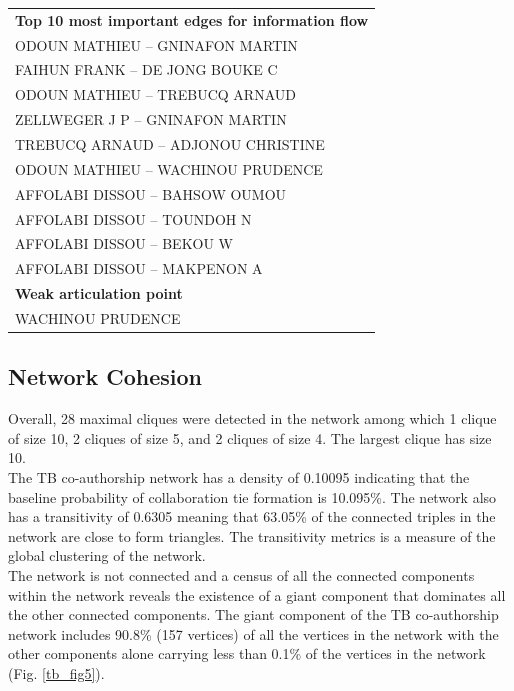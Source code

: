 \begin{table}[h!]
\begin{tabular}{l}
\hline
\textbf{Top 10 most important edges for information flow}\\
\hspace{20pt}ODOUN MATHIEU -- GNINAFON MARTIN\\
\hspace{20pt}FAIHUN FRANK -- DE JONG BOUKE C\\
\hspace{20pt}ODOUN MATHIEU -- TREBUCQ ARNAUD\\
\hspace{20pt}ZELLWEGER J P -- GNINAFON MARTIN\\
\hspace{20pt}TREBUCQ ARNAUD -- ADJONOU CHRISTINE\\
\hspace{20pt}ODOUN MATHIEU -- WACHINOU PRUDENCE\\
\hspace{20pt}AFFOLABI DISSOU -- BAHSOW OUMOU\\
\hspace{20pt}AFFOLABI DISSOU -- TOUNDOH N\\
\hspace{20pt}AFFOLABI DISSOU -- BEKOU W\\      
\hspace{20pt}AFFOLABI DISSOU -- MAKPENON A\\
\hline
\textbf{Weak articulation point}\\
\hspace{20pt}WACHINOU PRUDENCE\\
\bottomrule
\end{tabular}
\end{table}

\subsection{Network Cohesion}
Overall, 28 maximal cliques were detected in the network among which 1 clique of size 10, 2 cliques of size 5, and 2 cliques of size 4. The largest clique has size 10. \\The TB co-authorship network has a density of 0.10095 indicating that the baseline probability of collaboration tie formation is 10.095\%. The network also has a transitivity of 0.6305 meaning that 63.05\% of the connected triples in the network are close to form triangles. The transitivity metrics is a measure of the global clustering of the network.\\The network is not connected and a census of all the connected components within the network reveals the existence of a giant component that dominates all the other connected components. The giant component of the TB co-authorship network includes 90.8\% (157 vertices) of all the vertices in the network with the other components alone carrying less than 0.1\% of the vertices in the network (Fig. \ref{tb_fig5}). 

